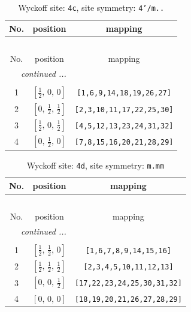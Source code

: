 \documentclass[fleqn,8pt]{jsarticle}
\begin{document}
\renewcommand{\arraystretch}{1.2}
\begin{longtable}{ccc}
\caption{Wyckoff site: {\tt 4c}, site symmetry: {\tt 4'/m..}}
 \\
 \hline \hline
No. & position & mapping \\ \hline \endfirsthead

\multicolumn{2}{l}{\tablename\ \thetable{}} \\
 \hline \hline
No. & position & mapping \\ \hline \endhead

 \hline \hline
\multicolumn{2}{r}{\footnotesize\it continued ...} \\ \endfoot

 \hline \hline
\multicolumn{2}{r}{} \\ \endlastfoot

1 & $\left[ \frac{1}{2},\, 0,\, 0 \right]$ & {\tt [1,6,9,14,18,19,26,27]} \\ \hline
2 & $\left[ 0,\, \frac{1}{2},\, \frac{1}{2} \right]$ & {\tt [2,3,10,11,17,22,25,30]} \\ \hline
3 & $\left[ \frac{1}{2},\, 0,\, \frac{1}{2} \right]$ & {\tt [4,5,12,13,23,24,31,32]} \\ \hline
4 & $\left[ 0,\, \frac{1}{2},\, 0 \right]$ & {\tt [7,8,15,16,20,21,28,29]} \\
\end{longtable}
\renewcommand{\arraystretch}{1.2}
\begin{longtable}{ccc}
\caption{Wyckoff site: {\tt 4d}, site symmetry: {\tt m.mm}}
 \\
 \hline \hline
No. & position & mapping \\ \hline \endfirsthead

\multicolumn{2}{l}{\tablename\ \thetable{}} \\
 \hline \hline
No. & position & mapping \\ \hline \endhead

 \hline \hline
\multicolumn{2}{r}{\footnotesize\it continued ...} \\ \endfoot

 \hline \hline
\multicolumn{2}{r}{} \\ \endlastfoot

1 & $\left[ \frac{1}{2},\, \frac{1}{2},\, 0 \right]$ & {\tt [1,6,7,8,9,14,15,16]} \\ \hline
2 & $\left[ \frac{1}{2},\, \frac{1}{2},\, \frac{1}{2} \right]$ & {\tt [2,3,4,5,10,11,12,13]} \\ \hline
3 & $\left[ 0,\, 0,\, \frac{1}{2} \right]$ & {\tt [17,22,23,24,25,30,31,32]} \\ \hline
4 & $\left[ 0,\, 0,\, 0 \right]$ & {\tt [18,19,20,21,26,27,28,29]} \\
\end{longtable}
\end{document}
